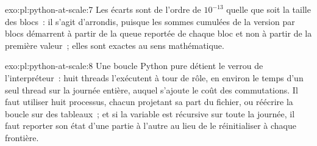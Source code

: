 \begin{solution}{exo:pl:python-at-scale:7}
Les écarts sont de l'ordre de $10^{-13}$ quelle que soit la taille des blocs~: il s'agit d'arrondis, puisque les sommes cumulées de la version par blocs
démarrent à partir de la queue reportée de chaque bloc et non à partir de la première valeur~; elles sont exactes au sens mathématique.
\end{solution}

\begin{solution}{exo:pl:python-at-scale:8}
Une boucle Python pure détient le verrou de l'interpréteur~: huit threads l'exécutent à tour de rôle, en environ le temps d'un seul thread sur la journée
entière, auquel s'ajoute le coût des commutations. Il faut utiliser huit processus, chacun projetant sa part du fichier, ou réécrire la boucle sur des tableaux~; et si la
variable est récursive sur toute la journée, il faut reporter son état d'une partie à l'autre au lieu de le réinitialiser à chaque frontière.
\end{solution}

